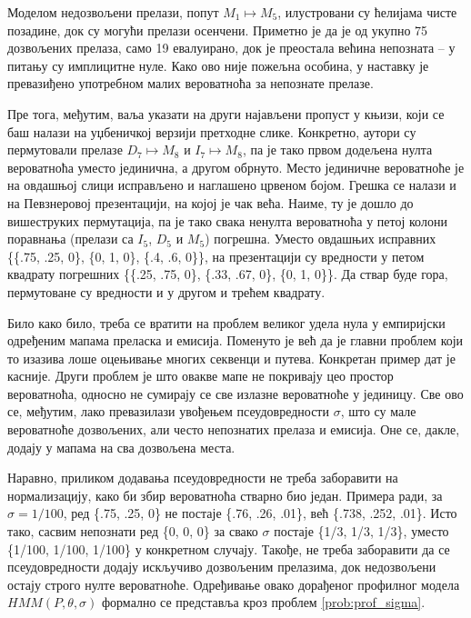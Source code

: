 \documentclass[12pt,oneside]{memoir}
\begin{document}
\begin{CJK}{UTF8}{ipxm}
Моделом недозвољени прелази, попут $M_1 \mapsto M_5$, илустровани су ћелијама чисте позадине, док су могући прелази осенчени. Приметно је да је од укупно 75 дозвољених прелаза, само 19 евалуирано, док је преостала већина непозната -- у питању су имплицитне нуле. Како ово није пожељна особина, у наставку је превазиђено употребном малих вероватноћа за непознате прелазе.

Пре тога, међутим, ваља указати на други најављени пропуст у књизи, који се баш налази на уџбеничкој верзији претходне слике. Конкретно, аутори су пермутовали прелазе $D_7 \mapsto M_8$ и $I_7 \mapsto M_8$, па је тако првом додељена нулта вероватноћа уместо јединична, а другом обрнуто. Место јединичне вероватноће је на овдашњој слици исправљено и наглашено црвеном бојом. Грешка се налази и на Певзнеровој презентацији, на којој је чак већа. Наиме, ту је дошло до вишеструких пермутација, па је тако свака ненулта вероватноћа у петој колони поравнања (прелази са $I_5$, $D_5$ и $M_5$) погрешна. Уместо овдашњих исправних \{\{.75, .25, 0\}, \{0, 1, 0\}, \{.4, .6, 0\}\}, на презентацији су вредности у петом квадрату погрешних \{\{.25, .75, 0\}, \{.33, .67, 0\}, \{0, 1, 0\}\}. Да ствар буде гора, пермутоване су вредности и у другом и трећем квадрату.

Било како било, треба се вратити на проблем великог удела нула у емпиријски одређеним мапама преласка и емисија. Поменуто је већ да је главни проблем који то изазива лоше оцењивање многих секвенци и путева. Конкретан пример дат је касније. Други проблем је што овакве мапе не покривају цео простор вероватноћа, односно не сумирају се све излазне вероватноће у јединицу. Све ово се, међутим, лако превазилази увођењем псеудовредности $\sigma$, што су мале вероватноће дозвољених, али често непознатих прелаза и емисија. Оне се, дакле, додају у мапама на сва дозвољена места.

Наравно, приликом додавања псеудовредности не треба заборавити на нормализацију, како би збир вероватноћа стварно био један. Примера ради, за $\sigma = 1/100$, ред \{.75, .25, 0\} не постаје \{.76, .26, .01\}, већ \{.738, .252, .01\}. Исто тако, сасвим непознати ред \{0, 0, 0\} за свако $\sigma$ постаје \{1/3, 1/3, 1/3\}, уместо \{1/100, 1/100, 1/100\} у конкретном случају. Такође, не треба заборавити да се псеудовредности додају искључиво дозвољеним прелазима, док недозвољени остају строго нулте вероватноће. Одређивање овако дорађеног профилног модела $HMM(P, \theta, \sigma)$ формално се представља кроз проблем \ref{prob:prof_sigma}.


\end{CJK}
\end{document}
